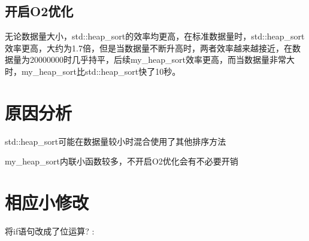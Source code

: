 \documentclass[UTF8]{ctexart}
\begin{document}
\subsection{开启O2优化}
无论数据量大小，std::heap\_sort的效率均更高，在标准数据量时，std::heap\_sort效率更高，大约为1.7倍，但是当数据量不断升高时，两者效率越来越接近，在数据量为20000000时几乎持平，后续my\_heap\_sort效率更高，而当数据量非常大时，my\_heap\_sort比std::heap\_sort快了10秒。

\section{原因分析}

std::heap\_sort可能在数据量较小时混合使用了其他排序方法

my\_heap\_sort内联小函数较多，不开启O2优化会有不必要开销

\section{相应小修改}

将if语句改成了位运算? :
\end{document}
